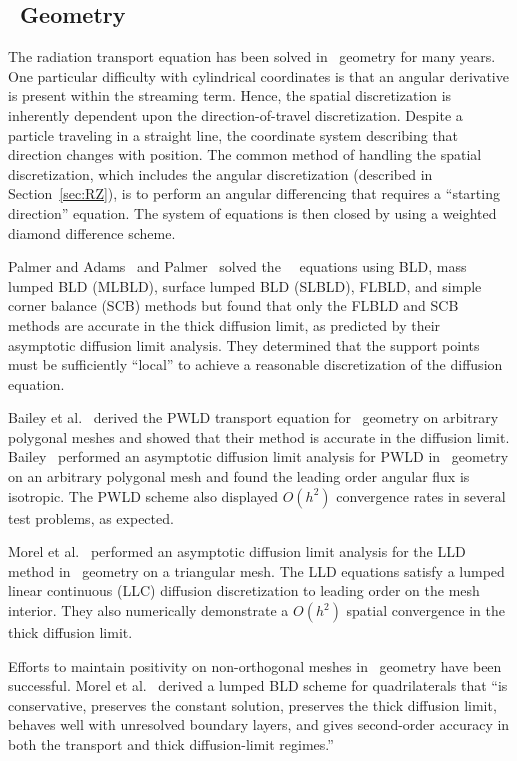 \documentclass{article}
\begin{document}
\subsection{\RZ\ Geometry}
\label{sec:RZGeometryIntro}
The radiation transport equation has been solved in \RZ\ geometry for many years. One particular difficulty with cylindrical coordinates is that an angular derivative is present within the streaming term. Hence, the spatial discretization is inherently dependent upon the direction-of-travel discretization. Despite a particle traveling in a straight line, the coordinate system describing that direction changes with position. The common method of handling the spatial discretization, which includes the angular discretization (described in Section~\ref{sec:RZ}), is to perform an angular differencing that requires a ``starting direction'' equation. The system of equations is then closed by using a weighted diamond difference scheme.

Palmer and Adams~\cite{PalmerCurvilinearTransport} and Palmer~\cite{PalmerDissertation} solved the \RZ\ \SN\ equations using BLD, mass lumped BLD (MLBLD), surface lumped BLD (SLBLD), FLBLD, and simple corner balance (SCB) methods but found that only the FLBLD and SCB methods are accurate in the thick diffusion limit, as predicted by their asymptotic diffusion limit analysis. They determined that the support points must be sufficiently ``local'' to achieve a reasonable discretization of the diffusion equation.

Bailey et al.~\cite{BaileyDFEMCylindrical} derived the PWLD transport equation for \RZ\ geometry on arbitrary polygonal meshes and showed that their method is accurate in the diffusion limit. Bailey~\cite{BaileyDissertation} performed an asymptotic diffusion limit analysis for PWLD in \RZ\ geometry on an arbitrary polygonal mesh and found the leading order angular flux is isotropic. The PWLD scheme also displayed $O(h^2)$ convergence rates in several test problems, as expected.

Morel et al.~\cite{MorelLLDrz} performed an asymptotic diffusion limit analysis for the LLD method in \RZ\ geometry on a triangular mesh. The LLD equations satisfy a lumped linear continuous (LLC) diffusion discretization to leading order on the mesh interior. They also numerically demonstrate a $O(h^2)$ spatial convergence in the thick diffusion limit.

Efforts to maintain positivity on non-orthogonal meshes in \RZ\ geometry have been successful. Morel et al.~\cite{MorelLBLD} derived a lumped BLD scheme for quadrilaterals that ``is conservative, preserves the constant solution, preserves the thick diffusion limit, behaves well with unresolved boundary layers, and gives second-order accuracy in both the transport and thick diffusion-limit regimes.''
\end{document}
